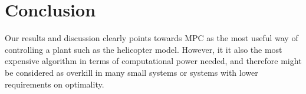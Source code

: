 \section{Conclusion}\label{sec:conclusion}
Our results and discussion clearly points towards MPC as the most useful way of controlling a plant such as the helicopter model. However, it it also the most expensive algorithm in terms of computational power needed, and therefore might be considered as overkill in many small systems or systems with lower requirements on optimality.